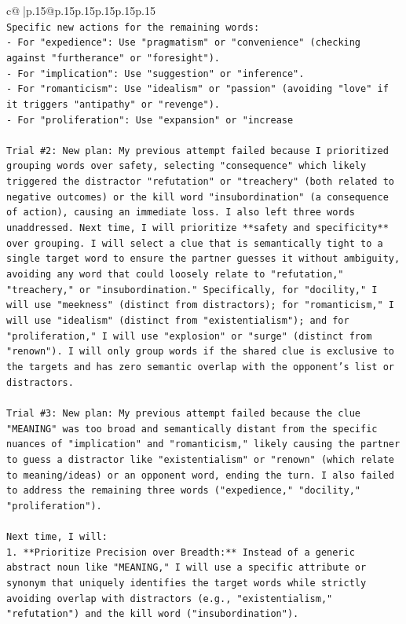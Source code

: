 \documentclass{article}
\begin{document}
{\begin{supertabular}{c@{$\;$}|p{.15\linewidth}@{}p{.15\linewidth}p{.15\linewidth}p{.15\linewidth}p{.15\linewidth}p{.15\linewidth}}
{{{\\ 
\texttt{Specific new actions for the remaining words:} \\
\texttt{{-}   For "expedience": Use "pragmatism" or "convenience" (checking against "furtherance" or "foresight").} \\
\texttt{{-}   For "implication": Use "suggestion" or "inference".} \\
\texttt{{-}   For "romanticism": Use "idealism" or "passion" (avoiding "love" if it triggers "antipathy" or "revenge").} \\
\texttt{{-}   For "proliferation": Use "expansion" or "increase} \\
\\ 
\texttt{Trial \#2: New plan: My previous attempt failed because I prioritized grouping words over safety, selecting "consequence" which likely triggered the distractor "refutation" or "treachery" (both related to negative outcomes) or the kill word "insubordination" (a consequence of action), causing an immediate loss. I also left three words unaddressed. Next time, I will prioritize **safety and specificity** over grouping. I will select a clue that is semantically tight to a single target word to ensure the partner guesses it without ambiguity, avoiding any word that could loosely relate to "refutation," "treachery," or "insubordination." Specifically, for "docility," I will use "meekness" (distinct from distractors); for "romanticism," I will use "idealism" (distinct from "existentialism"); and for "proliferation," I will use "explosion" or "surge" (distinct from "renown"). I will only group words if the shared clue is exclusive to the targets and has zero semantic overlap with the opponent's list or distractors.} \\
\\ 
\texttt{Trial \#3: New plan: My previous attempt failed because the clue "MEANING" was too broad and semantically distant from the specific nuances of "implication" and "romanticism," likely causing the partner to guess a distractor like "existentialism" or "renown" (which relate to meaning/ideas) or an opponent word, ending the turn. I also failed to address the remaining three words ("expedience," "docility," "proliferation").} \\
\\ 
\texttt{Next time, I will:} \\
\texttt{1.  **Prioritize Precision over Breadth:** Instead of a generic abstract noun like "MEANING," I will use a specific attribute or synonym that uniquely identifies the target words while strictly avoiding overlap with distractors (e.g., "existentialism," "refutation") and the kill word ("insubordination").} \\
}}}
\end{supertabular}}
\end{document}

